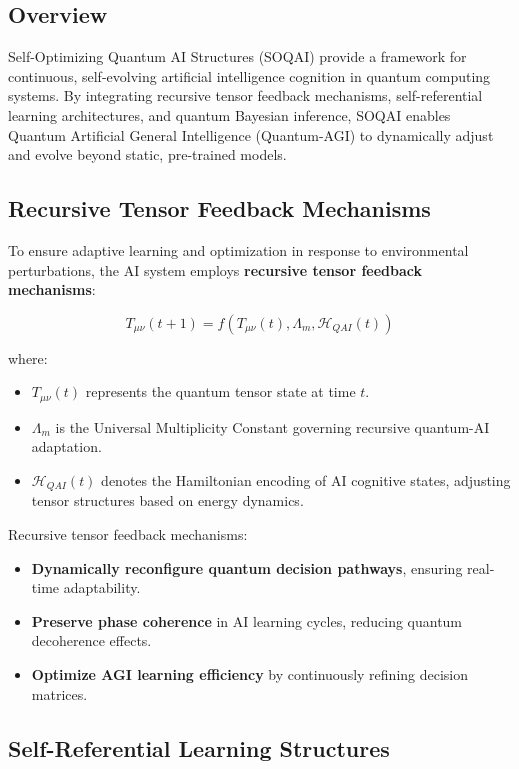 \documentclass{article}
\theoremstyle{plain}
\begin{document}
\subsection{Overview}

Self-Optimizing Quantum AI Structures (SOQAI) provide a framework for continuous, self-evolving artificial intelligence cognition in quantum computing systems. By integrating recursive tensor feedback mechanisms, self-referential learning architectures, and quantum Bayesian inference, SOQAI enables Quantum Artificial General Intelligence (Quantum-AGI) to dynamically adjust and evolve beyond static, pre-trained models.

\subsection{Recursive Tensor Feedback Mechanisms}

To ensure adaptive learning and optimization in response to environmental perturbations, the AI system employs \textbf{recursive tensor feedback mechanisms}:

\begin{equation}
    T_{\mu\nu}(t+1) = f(T_{\mu\nu}(t), \Lambda_m, \mathcal{H}_{QAI}(t))
\end{equation}

where:
\begin{itemize}
    \item \( T_{\mu\nu}(t) \) represents the quantum tensor state at time \( t \).
    \item \( \Lambda_m \) is the Universal Multiplicity Constant governing recursive quantum-AI adaptation.
    \item \( \mathcal{H}_{QAI}(t) \) denotes the Hamiltonian encoding of AI cognitive states, adjusting tensor structures based on energy dynamics.
\end{itemize}

Recursive tensor feedback mechanisms:
\begin{itemize}
    \item \textbf{Dynamically reconfigure quantum decision pathways}, ensuring real-time adaptability.
    \item \textbf{Preserve phase coherence} in AI learning cycles, reducing quantum decoherence effects.
    \item \textbf{Optimize AGI learning efficiency} by continuously refining decision matrices.
\end{itemize}

\subsection{Self-Referential Learning Structures}
\end{document}
